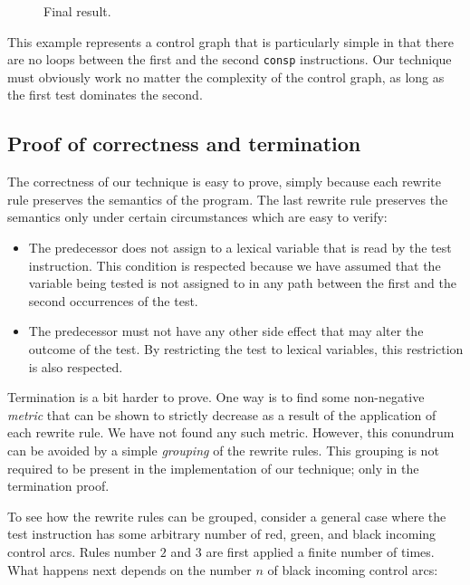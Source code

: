 \begin{figure}
\begin{center}
\end{center}
\caption{\label{fig-rewrite-8}
Final result.}
\end{figure}

This example represents a control graph that is particularly simple in
that there are no loops between the first and the second
\texttt{consp} instructions.  Our technique must obviously work no
matter the complexity of the control graph, as long as the first test
dominates the second.

\subsection{Proof of correctness and termination}

The correctness of our technique is easy to prove, simply because each
rewrite rule preserves the semantics of the program.  The last rewrite
rule preserves the semantics only under certain circumstances which
are easy to verify:

\begin{itemize}
\item The predecessor does not assign to a lexical variable that is
  read by the test instruction.  This condition is respected because
  we have assumed that the variable being tested is not assigned to
  in any path between the first and the second occurrences of the
  test.
\item The predecessor must not have any other side effect that may
  alter the outcome of the test.  By restricting the test to lexical
  variables, this restriction is also respected.
\end{itemize}

Termination is a bit harder to prove.  One way is to find some
non-negative \emph{metric} that can be shown to strictly decrease as a
result of the application of each rewrite rule.  We have not found any
such metric.  However, this conundrum can be avoided by a simple
\emph{grouping} of the rewrite rules.  This grouping is not required
to be present in the implementation of our technique; only in the
termination proof.

To see how the rewrite rules can be grouped, consider a general case
where the test instruction has some arbitrary number of red, green,
and black incoming control arcs.  Rules number $2$ and $3$ are first
applied a finite number of times.  What happens next depends on the
number $n$ of black incoming control arcs:

